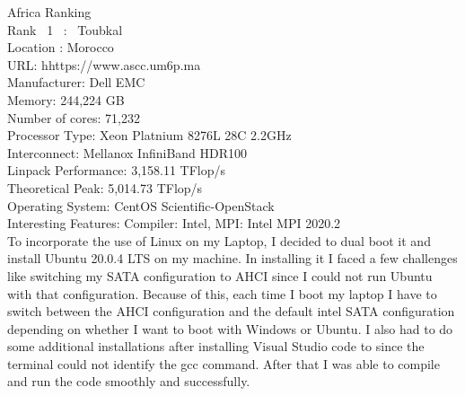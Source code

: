 \documentclass{article}
\begin{document}
\newpage
Africa Ranking \\
Rank \ 1 \ : \ Toubkal \\
Location : Morocco\\
URL:  hhttps://www.ascc.um6p.ma\\
Manufacturer: Dell EMC\\
Memory: 244,224 GB\\
Number of cores: 71,232\\
 Processor Type: Xeon Platnium 8276L 28C 2.2GHz\\
Interconnect: Mellanox InfiniBand HDR100\\
Linpack Performance: 3,158.11 TFlop/s\\
Theoretical Peak: 5,014.73 TFlop/s\\
Operating System: CentOS Scientific-OpenStack\\
Interesting Features: Compiler:  Intel, MPI: Intel MPI 2020.2\\

To incorporate the use of Linux on my Laptop, I decided to dual boot it and install Ubuntu 20.0.4 LTS on my machine. In installing it I faced a few challenges like switching my SATA configuration to AHCI since I could not run Ubuntu with that configuration. Because of this, each time I boot my laptop I have to switch between the AHCI configuration and the default intel SATA configuration depending on whether I want to boot with Windows or Ubuntu. I also had to do some additional installations after installing Visual Studio code to since the terminal could not identify the gcc command.  After that I was able to compile and run the code smoothly and successfully.
\end{document}
